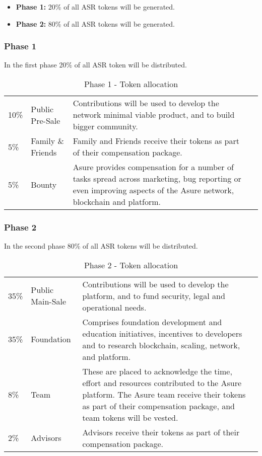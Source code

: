\begin{itemize}
\item \textbf{Phase 1:} 20\% of all ASR tokens will be generated.
\item \textbf{Phase 2:} 80\% of all ASR tokens will be generated.
\end{itemize}

\subsubsection{Phase 1}

In the first phase 20\% of all ASR token will be distributed.

\begin{table}[H]
\begin{tabular}{llp{}l}
  10\% & Public Pre-Sale & Contributions will be used to develop the network minimal viable product, and to build bigger community.\\
  5\% & Family \& Friends & Family and Friends receive their tokens as part of their compensation package.\\
  5\% & Bounty & Asure provides compensation for a number of tasks spread across marketing, bug reporting or even improving aspects of the Asure network, blockchain and platform.
\end{tabular}
\caption{\label{tab:table-name} Phase 1 - Token allocation}
\end{table}

\subsubsection{Phase 2}

In the second phase 80\% of all ASR tokens will be distributed.

\begin{table}[H]
\begin{tabular}{llp{}l}
  35\% & Public Main-Sale & Contributions will be used to develop the platform, and to fund security, legal and operational needs. \\
  35\% & Foundation & Comprises foundation development and education initiatives, incentives to developers and to research blockchain, scaling, network, and platform.\\
  8\% & Team  & These are placed to acknowledge the time, effort and resources contributed to the Asure platform.  The Asure team receive their tokens as part of their compensation package, and team tokens will be vested.\\
  2\% & Advisors & Advisors receive their tokens as part of their compensation package.
\end{tabular}
\caption{\label{tab:table-name} Phase 2 - Token allocation}
\end{table}

